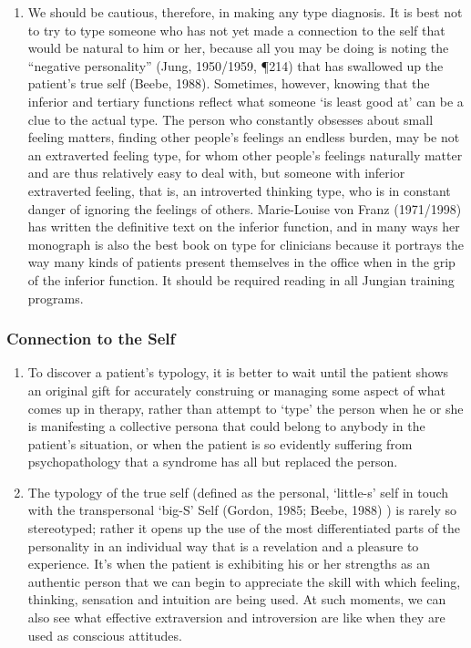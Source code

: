 \begin{enumerate}
\item {} We should be cautious,
therefore, in making any type diagnosis. It is best not to try to type someone
who has not yet made a connection to the self that would be natural to him or
her, because all you may be doing is noting the “negative personality” (Jung,
1950/1959, ¶214) that has swallowed up the patient’s true self (Beebe, 1988).
Sometimes, however, knowing that the inferior and tertiary functions reflect
what someone ‘is least good at’ can be a clue to the actual type. The person
who constantly obsesses about small feeling matters, finding other people’s
feelings an endless burden, may be not an extraverted feeling type, for whom
other people’s feelings naturally matter and are thus relatively easy to deal
with, but someone with inferior extraverted feeling, that is, an introverted
thinking type, who is in constant danger of ignoring the feelings of others.
Marie-Louise von Franz (1971/1998) has written the definitive text on the
inferior function, and in many ways her monograph is also the best book on type
for clinicians because it portrays the way many kinds of patients present
themselves in the office when in the grip of the inferior function. It should
be required reading in all Jungian training programs.

\end{enumerate}

\subsubsection{Connection to the Self}

\begin{enumerate}

\item {} To discover a patient’s typology, it is better
to wait until the patient shows an original gift for accurately construing or
managing some aspect of what comes up in therapy, rather than attempt to ‘type’
the person when he or she is manifesting a collective persona that could belong
to anybody in the patient’s situation, or when the patient is so evidently
suffering from psychopathology that a syndrome has all but replaced the person.

\item {} The typology of the true self (defined as
the personal, ‘little-s’ self in touch with the transpersonal ‘big-S’ Self
(Gordon, 1985; Beebe, 1988) ) is rarely so stereotyped; rather it opens up the
use of the most differentiated parts of the personality in an individual way
that is a revelation and a pleasure to experience. It’s when the patient is
exhibiting his or her strengths as an authentic person that we can begin to
appreciate the skill with which feeling, thinking, sensation and intuition are
being used. At such moments, we can also see what effective extraversion and
introversion are like when they are used as conscious attitudes.

\end{enumerate}

